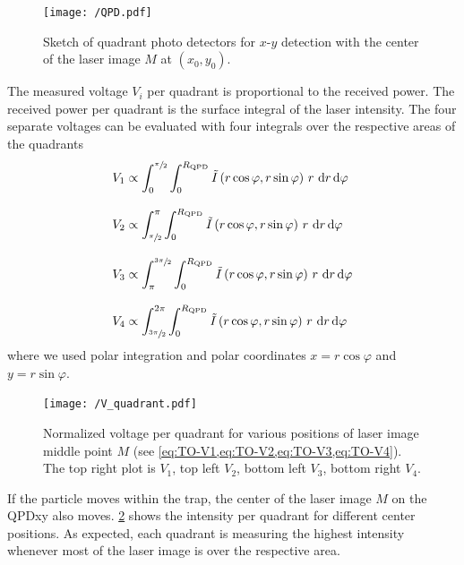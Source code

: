 \begin{figure}[tbp]
  \centering
  \texttt{[image: /QPD.pdf]}
  \caption{Sketch of quadrant photo detectors for $x$-$y$ detection with the 
  center of the laser image $M$ at $(x_{0}, y_{0})$.}
  \label{fig:TO-QPD}
\end{figure}

The measured voltage $V_{i}$ per quadrant is proportional to the received 
power. The received power per quadrant is the surface integral of the laser 
intensity. The four separate voltages can be evaluated with four integrals over 
the respective areas of the quadrants
\begin{subequations}
\begin{align}
  V_{\mathrm{1}} & \propto \int_{0}^{\sfrac{\pi}{2}}\int_{0}^{R_{\mathrm{QPD}}}
  \tilde{I}\left( r\cos\varphi, r\sin\varphi 
  \right)\,r\,\dd{r}\dd{\varphi}
  \label{eq:TO-V1}
  \\[3mm]
  V_{\mathrm{2}} & \propto \int_{\sfrac{\pi}{2}}^{\pi}\int_{0}^{R_{\mathrm{QPD}}}
  \tilde{I}\left(r\cos\varphi, 
  r\sin\varphi\right)\,r\,\dd{r}\dd{\varphi}
  \label{eq:TO-V2}
  \\[3mm]
  V_{\mathrm{3}} & \propto \int_{\pi}^{\sfrac{3\pi}{2}}\int_{0}^{R_{\mathrm{QPD}}}
  \tilde{I}\left(r\cos\varphi, 
  r\sin\varphi\right)\,r\,\dd{r}\dd{\varphi}
  \label{eq:TO-V3}
  \\[3mm]
  V_{\mathrm{4}} & \propto \int_{\sfrac{3\pi}{2}}^{2\pi}\int_{0}^{R_{\mathrm{QPD}}}
  \tilde{I}\left(r\cos\varphi, 
  r\sin\varphi\right)\,r\,\dd{r}\dd{\varphi}
  \label{eq:TO-V4}
\end{align}
\end{subequations}
where we used polar integration and polar coordinates $x=r\cos\varphi$ and 
$y=r\sin\varphi$.

\begin{figure}[tbp]
  \centering
  \texttt{[image: /V\_quadrant.pdf]}
  \caption{Normalized voltage per quadrant for various positions of laser image 
  middle point $M$ (see \cref{eq:TO-V1,eq:TO-V2,eq:TO-V3,eq:TO-V4}). The top 
right plot is $V_{1}$, top left $V_{2}$, bottom left $V_{3}$, bottom right 
$V_{4}$.}
  \label{fig:TO-quadrant_Intensity}
\end{figure}

If the particle moves within the trap, the center of the laser image $M$ on the 
QPDxy also moves. \cref{fig:TO-quadrant_Intensity} shows the intensity per 
quadrant for different center positions. As expected, each quadrant is 
measuring the highest intensity whenever most of the laser image is over the 
respective area.

